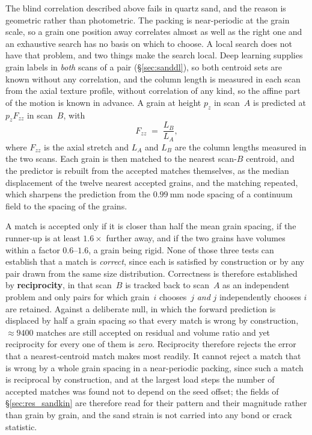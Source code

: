 \documentclass[preprint,12pt,numbers]{elsarticle}
\begin{document}
  The blind correlation described above fails in quartz sand, and the reason is geometric rather than photometric. The packing is near-periodic at the grain
  scale, so a grain one position away correlates almost as well as the right
  one and an exhaustive search has no basis on which to choose.  A local search
  does not have that problem, and two things make the search local.  Deep
  learning supplies grain labels in \emph{both} scans of a pair
  (\S\ref{sec:sanddl}), so both centroid sets are known without any
  correlation, and the column length is measured in each scan from the axial
  texture profile,
  without correlation of any kind, so the affine part of the motion is known in
  advance.  A grain at height $p_z$ in scan~$A$ is predicted at $p_z F_{zz}$ in
  scan~$B$, with
  \begin{equation}
    F_{zz} \;=\; \frac{L_B}{L_A},
    \label{eq:fzz}
  \end{equation}
  where $F_{zz}$ is the axial stretch and $L_A$ and $L_B$ are the column
  lengths measured in the two scans.  Each grain is then
  matched to the nearest scan-$B$ centroid, and the predictor is rebuilt from
  the accepted matches themselves, as the median displacement of the twelve
  nearest accepted grains, and the matching repeated, which sharpens the
  prediction from the $\SI{0.99}{\milli\meter}$ node spacing of a continuum
  field to the spacing of the grains.

  A match is accepted only if it is closer than half the mean grain spacing, if
  the runner-up is at least $1.6\times$ further away, and if the two grains have
  volumes within a factor $0.6$--$1.6$, a grain being rigid.  None of those
  three tests can establish that a match is \emph{correct}, since each is
  satisfied by construction or by any pair drawn from the same size
  distribution.  Correctness is therefore established by \textbf{reciprocity},
  in that scan~$B$ is tracked back to scan~$A$ as an independent problem and only
  pairs for which grain~$i$ chooses~$j$ \emph{and} $j$ independently chooses
  $i$ are retained.  Against a deliberate null, in which the forward prediction
  is displaced by half a grain spacing so that every match is wrong by
  construction, ${\approx}9400$ matches are still accepted on residual and
  volume ratio and yet reciprocity for every one of them is \emph{zero}.
  Reciprocity therefore rejects the error that a nearest-centroid match makes
  most readily.  It cannot reject a match that is wrong by a whole grain
  spacing in a near-periodic packing, since such a match is reciprocal by
  construction, and at the largest load steps the number of accepted matches
  was found not to depend on the seed offset; the fields of
  \S\ref{sec:res_sandkin} are therefore read for their pattern and their
  magnitude rather than grain by grain, and the sand strain is not carried
  into any bond or crack statistic.
\end{document}
